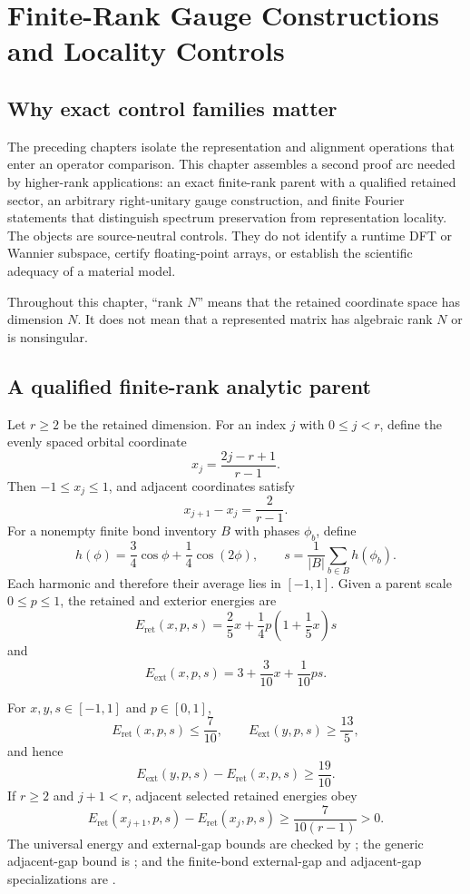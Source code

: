 \chapter{Finite-Rank Gauge Constructions and Locality Controls}
\label{ch:finite-rank-gauge-locality}

\section{Why exact control families matter}

The preceding chapters isolate the representation and alignment operations that enter an
operator comparison.  This chapter assembles a second proof arc needed by higher-rank
applications: an exact finite-rank parent with a qualified retained sector, an arbitrary
right-unitary gauge construction, and finite Fourier statements that distinguish spectrum
preservation from representation locality.  The objects are source-neutral controls.  They do
not identify a runtime DFT or Wannier subspace, certify floating-point arrays, or establish the
scientific adequacy of a material model.

Throughout this chapter, ``rank $N$'' means that the retained coordinate space has dimension
$N$.  It does not mean that a represented matrix has algebraic rank $N$ or is nonsingular.

\section{A qualified finite-rank analytic parent}

Let $r\geq 2$ be the retained dimension.  For an index $j$ with $0\leq j<r$, define the evenly
spaced orbital coordinate
\[
  x_j=\frac{2j-r+1}{r-1}.
\]
Then $-1\leq x_j\leq 1$, and adjacent coordinates satisfy
\[
  x_{j+1}-x_j=\frac{2}{r-1}.
\]
For a nonempty finite bond inventory $B$ with phases $\phi_b$, define
\[
  h(\phi)=\frac34\cos\phi+\frac14\cos(2\phi),
  \qquad
  s=\frac{1}{|B|}\sum_{b\in B}h(\phi_b).
\]
Each harmonic and therefore their average lies in $[-1,1]$.  Given a parent scale
$0\leq p\leq 1$, the retained and exterior energies are
\[
  E_{\mathrm{ret}}(x,p,s)
    =\frac25x+\frac14p\left(1+\frac15x\right)s
\]
and
\[
  E_{\mathrm{ext}}(x,p,s)
    =3+\frac3{10}x+\frac1{10}ps.
\]

\begin{theorem}
\label{thm:finite-rank-gap-controls}
For $x,y,s\in[-1,1]$ and $p\in[0,1]$,
\[
  E_{\mathrm{ret}}(x,p,s)\leq\frac7{10},
  \qquad
  E_{\mathrm{ext}}(y,p,s)\geq\frac{13}{5},
\]
and hence
\[
  E_{\mathrm{ext}}(y,p,s)-E_{\mathrm{ret}}(x,p,s)
    \geq\frac{19}{10}.
\]
If $r\geq2$ and $j+1<r$, adjacent selected retained energies obey
\[
  E_{\mathrm{ret}}(x_{j+1},p,s)-E_{\mathrm{ret}}(x_j,p,s)
    \geq \frac{7}{10(r-1)}>0.
\]
The universal energy and external-gap bounds are checked by
; the generic adjacent-gap bound is
; and the finite-bond external-gap and adjacent-gap
specializations are .
\end{theorem}

